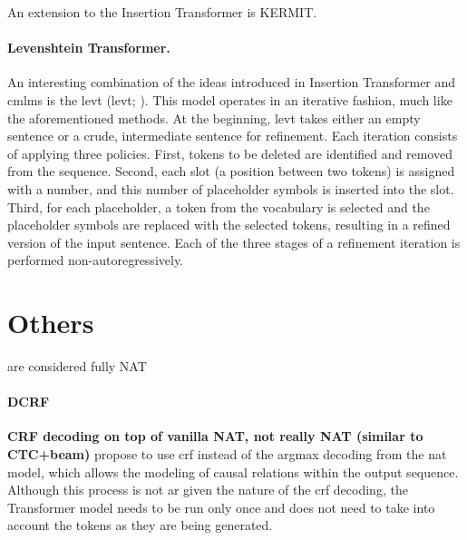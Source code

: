 An extension to the Insertion Transformer is
KERMIT. \citep{chan-etal-2019-kermit} 


\paragraph{Levenshtein Transformer.} An interesting combination of the ideas
introduced in Insertion Transformer and \acp{cmlm} is the \acl{levt}
(\acs{levt}; \citealp{gu-etal-2019-levenshtein}). This model
operates in an iterative fashion, much like the aforementioned methods. At the
beginning, \ac{levt} takes either an empty sentence or a crude, intermediate
sentence for refinement. Each iteration consists of applying three
policies. First, tokens to be deleted are identified and removed from the
sequence. Second, each slot (a position between two tokens) is assigned with a
number, and this number of placeholder symbols is inserted into the slot.
Third, for each placeholder, a token from the vocabulary is selected and the
placeholder symbols are replaced with the selected tokens, resulting in a
refined version of the input sentence.  Each of the three stages of a
refinement iteration is performed non-autoregressively.





\section{Others}%
\label{sec:nat:misc}



 are considered fully NAT

\paragraph{DCRF} \textbf{CRF decoding on top of vanilla NAT, not really NAT
  (similar to CTC+beam)} \citet{sun2019fast} propose to use \ac{crf} instead of
the argmax decoding from the \ac{nat} model, which allows the modeling of
causal relations within the output sequence. Although this process is not
\acl{ar} given the nature of the \ac{crf} decoding, the Transformer model needs
to be run only once and does not need to take into account the tokens as they
are being generated.

